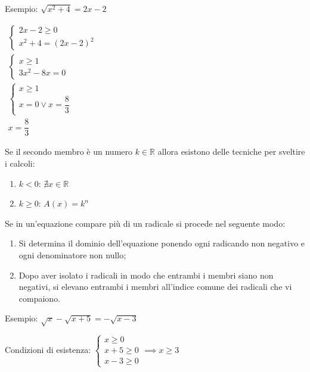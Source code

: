 \documentclass[a4paper]{article}
\theoremstyle{plain}
\theoremstyle{definition}
\theoremstyle{remark}
\newcommand{\R}{\mathbb{R}}
\begin{document}
Esempio: $\sqrt{x^2+4}=2x-2$

$\begin{array}{l}
    \begin{cases}
        2x-2\geq0\\
        x^2+4=(2x-2)^2
    \end{cases}\\
    \begin{cases}
        x\geq1\\
        3x^2-8x=0
    \end{cases}\\
    \begin{cases}
        x\geq1\\
        x=0\lor x=\dfrac{8}{3}
    \end{cases} \\
    x=\dfrac{8}{3}
\end{array}$

Se il secondo membro è un numero $k\in\R$ allora esistono delle tecniche per sveltire i calcoli:
\begin{enumerate}
    \item $k<0$: $\nexists x\in\R$
    \item $k\geq0$: $A(x)=k^n$
\end{enumerate}
Se in un'equazione compare più di un radicale si procede nel seguente modo:
\begin{enumerate}
    \item Si determina il dominio dell'equazione ponendo ogni radicando non negativo e ogni denominatore non nullo;
    \item Dopo aver isolato i radicali in modo che entrambi i membri siano non negativi, si elevano entrambi i membri all'indice comune dei radicali che vi compaiono.
\end{enumerate}
Esempio: $\sqrt{x}-\sqrt{x+5}=-\sqrt{x-3}$

Condizioni di esistenza: $\begin{cases}
    x\geq0\\
    x+5\geq0\\
    x-3\geq0
\end{cases}\implies x\geq3$
\end{document}
